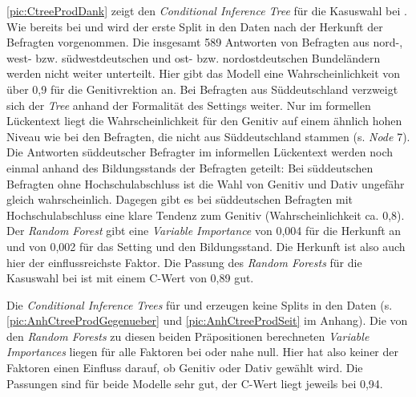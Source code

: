 \autoref{pic:CtreeProdDank} zeigt den \textit{Conditional Inference Tree} für die Kasuswahl bei \dank. 
Wie bereits bei \wegen{} und \waehrend{} wird der erste Split in den Daten nach der Herkunft der Befragten vorgenommen. 
Die insgesamt 589 Antworten von Befragten aus nord-, west- bzw. südwestdeutschen und ost- bzw. nordostdeutschen Bundeländern werden nicht weiter unterteilt. 
Hier gibt das Modell eine Wahrscheinlichkeit von über 0,9 für die Genitivrektion an. 
Bei Befragten aus Süddeutschland verzweigt sich der \textit{Tree} anhand der Formalität des Settings weiter.
Nur im formellen Lückentext liegt die Wahrscheinlichkeit für den Genitiv auf einem ähnlich hohen Niveau wie bei den Befragten, die nicht aus Süddeutschland stammen (s. \textit{Node} 7).
Die Antworten süddeutscher Befragter im informellen Lückentext werden noch einmal anhand des Bildungsstands der Befragten geteilt:
Bei süddeutschen Befragten ohne Hochschulabschluss ist die Wahl von Genitiv und Dativ ungefähr gleich wahrscheinlich. 
Dagegen gibt es bei süddeutschen Befragten mit Hochschulabschluss eine klare Tendenz zum Genitiv (Wahrscheinlichkeit ca. 0,8). 
Der \textit{Random Forest} gibt eine \textit{Variable Importance} von 0,004 für die Herkunft an und von 0,002 für das Setting und den Bildungsstand. 
Die Herkunft ist also auch hier der einflussreichste Faktor. 
Die Passung des \textit{Random Forests} für die Kasuswahl bei \dank{} ist mit einem C-Wert von 0,89 gut. 

Die \textit{Conditional Inference Trees} für \gegenueber{} und  erzeugen keine Splits in den Daten (s. \autoref{pic:AnhCtreeProdGegenueber} und \autoref{pic:AnhCtreeProdSeit} im Anhang). 
Die von den \textit{Random Forests} zu diesen beiden Präpositionen berechneten \textit{Variable Importances} liegen für alle Faktoren bei oder nahe null.
Hier hat also keiner der Faktoren einen Einfluss darauf, ob Genitiv oder Dativ gewählt wird. 
Die Passungen sind für beide Modelle sehr gut, der C-Wert liegt jeweils bei 0,94. 
%

